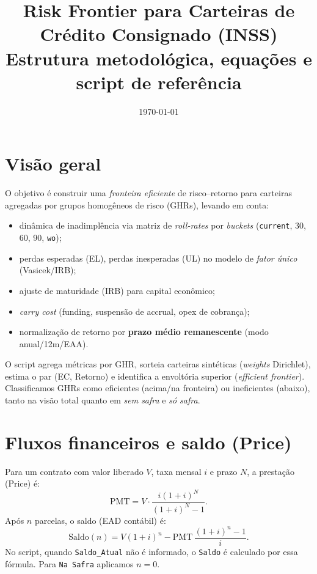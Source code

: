 \documentclass[11pt,a4paper]{article}
\title{Risk Frontier para Carteiras de Crédito Consignado (INSS)\\
\large Estrutura metodológica, equações e script de referência}
\author{%
  }
\date{\today}
\newcommand{\1}{\mathbf{1}}
\begin{document}
\maketitle

\section{Visão geral}
O objetivo é construir uma \emph{fronteira eficiente} de risco--retorno para carteiras agregadas por grupos homogêneos de risco (GHRs), levando em conta:
\begin{itemize}[noitemsep,topsep=2pt]
  \item dinâmica de inadimplência via matriz de \emph{roll-rates} por \emph{buckets} (\texttt{current}, 30, 60, 90, \texttt{wo});
  \item perdas esperadas (EL), perdas inesperadas (UL) no modelo de \emph{fator único} (Vasicek/IRB);
  \item ajuste de maturidade (IRB) para capital econômico;
  \item \emph{carry cost} (funding, suspensão de accrual, opex de cobrança);
  \item normalização de retorno por \textbf{prazo médio remanescente} (modo anual/12m/EAA).
\end{itemize}

O script agrega métricas por GHR, sorteia carteiras sintéticas (\emph{weights} Dirichlet), estima o par (EC, Retorno) e identifica a envoltória superior (\emph{efficient frontier}). Classificamos GHRs como eficientes (acima/na fronteira) ou ineficientes (abaixo), tanto na visão total quanto em \emph{sem safra} e \emph{só safra}.

\section{Fluxos financeiros e saldo (Price)}
Para um contrato com valor liberado $V$, taxa mensal $i$ e prazo $N$, a prestação (Price) é:
\begin{equation}
\mathrm{PMT} = V \cdot \frac{i(1+i)^N}{(1+i)^N - 1}. 
\end{equation}
Após $n$ parcelas, o saldo (EAD contábil) é:
\begin{equation}
\mathrm{Saldo}(n) = V (1+i)^n - \mathrm{PMT}\,\frac{(1+i)^n - 1}{i}.
\end{equation}
No script, quando \texttt{Saldo\_Atual} não é informado, o \texttt{Saldo} é calculado por essa fórmula. Para \texttt{Na Safra} aplicamos $n=0$.
\end{document}
